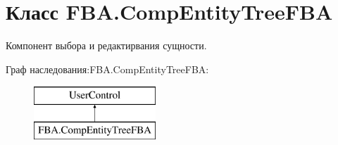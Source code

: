 \hypertarget{class_f_b_a_1_1_comp_entity_tree_f_b_a}{}\section{Класс F\+B\+A.\+Comp\+Entity\+Tree\+F\+BA}
\label{class_f_b_a_1_1_comp_entity_tree_f_b_a}


Компонент выбора и редактирвания сущности. ~\newline
 


Граф наследования\+:F\+B\+A.\+Comp\+Entity\+Tree\+F\+BA\+:\begin{figure}[H]
\begin{center}
\leavevmode
\includegraphics[height=2.000000cm]{class_f_b_a_1_1_comp_entity_tree_f_b_a}
\end{center}
\end{figure}
